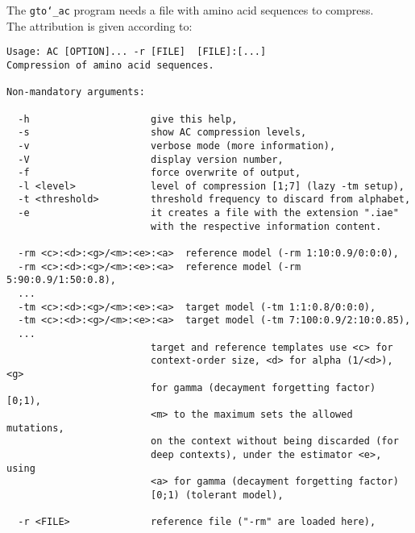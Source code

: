 The \texttt{gto\char`_ac} program needs a file with amino acid sequences to compress.\\
The attribution is given according to:
\begin{lstlisting}
Usage: AC [OPTION]... -r [FILE]  [FILE]:[...]                          
Compression of amino acid sequences.                                   
                                                                       
Non-mandatory arguments:                                               
                                                                       
  -h                     give this help,                               
  -s                     show AC compression levels,                   
  -v                     verbose mode (more information),              
  -V                     display version number,                       
  -f                     force overwrite of output,                    
  -l <level>             level of compression [1;7] (lazy -tm setup),  
  -t <threshold>         threshold frequency to discard from alphabet,
  -e                     it creates a file with the extension ".iae" 
                         with the respective information content.      
                                                                       
  -rm <c>:<d>:<g>/<m>:<e>:<a>  reference model (-rm 1:10:0.9/0:0:0),   
  -rm <c>:<d>:<g>/<m>:<e>:<a>  reference model (-rm 5:90:0.9/1:50:0.8),
  ...                                                                  
  -tm <c>:<d>:<g>/<m>:<e>:<a>  target model (-tm 1:1:0.8/0:0:0),       
  -tm <c>:<d>:<g>/<m>:<e>:<a>  target model (-tm 7:100:0.9/2:10:0.85), 
  ...                                                                  
                         target and reference templates use <c> for    
                         context-order size, <d> for alpha (1/<d>), <g>
                         for gamma (decayment forgetting factor) [0;1),
                         <m> to the maximum sets the allowed mutations,
                         on the context without being discarded (for   
                         deep contexts), under the estimator <e>, using
                         <a> for gamma (decayment forgetting factor)   
                         [0;1) (tolerant model),                       
                                                                       
  -r <FILE>              reference file ("-rm" are loaded here),     
                                                                       

\end{lstlisting}
